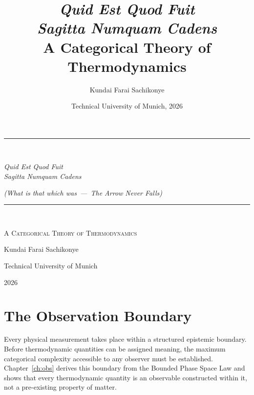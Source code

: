 \documentclass[12pt,a4paper,twoside,openright]{book}
\title{%
  \textit{Quid Est Quod Fuit}\\
  \textit{Sagitta Numquam Cadens}\\[0.8em]
  \large A Categorical Theory of Thermodynamics}
\author{Kundai Farai Sachikonye}
\date{Technical University of Munich, 2026}
\theoremstyle{plain}
\theoremstyle{definition}
\theoremstyle{remark}
\begin{document}

\frontmatter

\begin{titlepage}
  \centering
  \vspace*{3.5cm}
  \rule{\textwidth}{0.4pt}\\[1.2em]
  {\LARGE\itshape Quid Est Quod Fuit\\[0.5em]
   Sagitta Numquam Cadens\par}
  \vspace{0.8em}
  {\normalsize\itshape
    \textup{(}What is that which was\ ---\ The Arrow Never Falls\textup{)}\par}
  \vspace{1.2em}
  \rule{\textwidth}{0.4pt}\\[2.5em]
  {\Large\scshape A Categorical Theory of Thermodynamics\par}
  \vfill
  {\large Kundai Farai Sachikonye\par}
  \vspace{0.6em}
  {\normalsize Technical University of Munich\par}
  {\normalsize 2026\par}
  \vspace{2cm}
\end{titlepage}



\tableofcontents







\mainmatter

\part{The Observation Boundary}
\label{part:observation}

\noindent
Every physical measurement takes place within a structured epistemic boundary.
Before thermodynamic quantities can be assigned meaning, the maximum categorical
complexity accessible to any observer must be established.
Chapter~\ref{ch:obs} derives this boundary from the Bounded Phase Space Law
and shows that every thermodynamic quantity is an observable constructed within
it, not a pre-existing property of matter.
\end{document}
